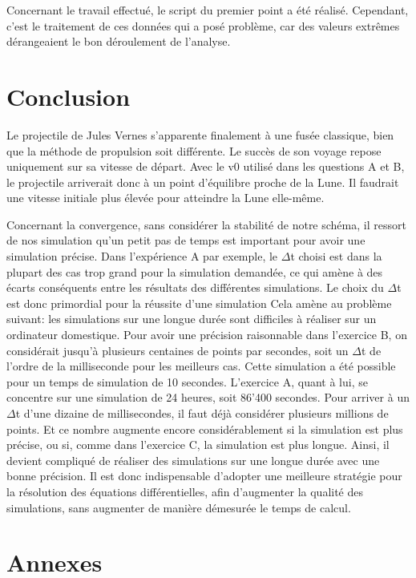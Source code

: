 \documentclass[a4paper,12pt,twoside]{article}
\begin{document}
Concernant le travail effectué, le script du premier point a été réalisé.
Cependant, c'est le traitement de ces données qui a posé problème, car des valeurs extrêmes dérangeaient le bon déroulement de l'analyse.

\section{Conclusion}
Le projectile de Jules Vernes s'apparente finalement à une fusée classique, bien que la méthode de propulsion soit différente.
Le succès de son voyage repose uniquement sur sa vitesse de départ.
Avec le v0 utilisé dans les questions A et B, le projectile arriverait donc à un point d'équilibre proche de la Lune. Il faudrait une vitesse initiale plus élevée pour atteindre la Lune elle-même.

Concernant la convergence, sans considérer la stabilité de notre schéma, il ressort de nos simulation qu'un petit pas de temps est important pour avoir une simulation précise.
Dans l'expérience A par exemple, le $\Delta$t choisi est dans la plupart des cas trop grand pour la simulation demandée, ce qui amène à des écarts conséquents entre les résultats des différentes simulations.
Le choix du $\Delta$t est donc primordial pour la réussite d'une simulation
Cela amène au problème suivant: les simulations sur une longue durée sont difficiles à réaliser sur un ordinateur domestique.
Pour avoir une précision raisonnable dans l'exercice B, on considérait jusqu'à plusieurs centaines de points par secondes, soit un $\Delta$t de l'ordre de la milliseconde pour les meilleurs cas.
Cette simulation a été possible pour un temps de simulation de 10 secondes.
L'exercice A, quant à lui, se concentre sur une simulation de 24 heures, soit 86'400 secondes.
Pour arriver à un $\Delta$t d'une dizaine de millisecondes, il faut déjà considérer plusieurs millions de points.
Et ce nombre augmente encore considérablement si la simulation est plus précise, ou si, comme dans l'exercice C, la simulation est plus longue.
Ainsi, il devient compliqué de réaliser des simulations sur une longue durée avec une bonne précision.
Il est donc indispensable d'adopter une meilleure stratégie pour la résolution des équations différentielles, afin d'augmenter la qualité des simulations, sans augmenter de manière démesurée le temps de calcul.


\appendix
\section*{Annexes}
\end{document}
